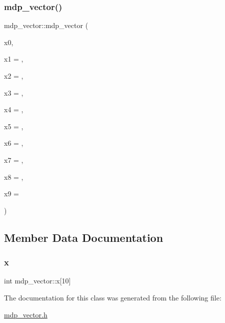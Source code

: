 \mbox{\label{classmdp__vector_a2329077b47bdadc32142aa6c2788ad6f}} 
\subsubsection{\texorpdfstring{mdp\+\_\+vector()}{mdp\_vector()}\hspace{0.1cm}{\footnotesize\ttfamily [2/2]}}
{\footnotesize\ttfamily mdp\+\_\+vector\+::mdp\+\_\+vector (\begin{DoxyParamCaption}\item[{int}]{x0,  }\item[{int}]{x1 = {},  }\item[{int}]{x2 = {},  }\item[{int}]{x3 = {},  }\item[{int}]{x4 = {},  }\item[{int}]{x5 = {},  }\item[{int}]{x6 = {},  }\item[{int}]{x7 = {},  }\item[{int}]{x8 = {},  }\item[{int}]{x9 = {} }\end{DoxyParamCaption})\hspace{0.3cm}{\ttfamily [inline]}}



\subsection{Member Data Documentation}
\mbox{\label{classmdp__vector_ae8332afc86ad8644e393657da2f109e4}} 
\subsubsection{\texorpdfstring{x}{x}}
{\footnotesize\ttfamily int mdp\+\_\+vector\+::x\mbox{[}10\mbox{]}}



The documentation for this class was generated from the following file\+:\begin{DoxyCompactItemize}
\item 
\hyperlink{mdp__vector_8h}{mdp\+\_\+vector.\+h}\end{DoxyCompactItemize}
